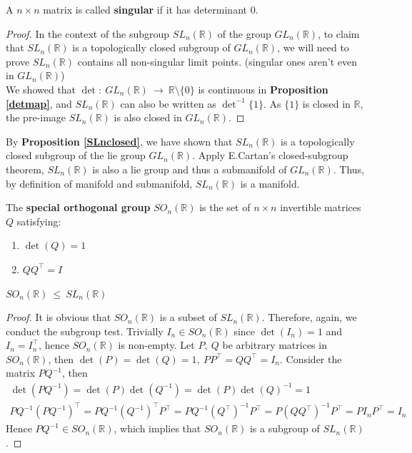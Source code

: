 \documentclass[12pt,twoside]{article}
\begin{document}
\begin{definition}
A $n\times n$ matrix is called \textbf{singular} if it has determinant 0.
\end{definition}

\begin{proof}
In the context of the subgroup $SL_{n}(\mathbb{R})$ of the group $GL_{n}(\mathbb{R})$, to claim that $SL_{n}(\mathbb{R})$ is a topologically closed subgroup of $GL_{n}(\mathbb{R})$, we will need to prove $SL_{n}(\mathbb{R})$ contains all non-singular limit points. (singular ones aren't even in $GL_{n}(\mathbb{R})$)\\
We showed that $\det:\ GL_{n}(\mathbb{R})\ \rightarrow\ \mathbb{R}\setminus \{0\}$ is continuous in \textbf{Proposition \ref{detmap}}, and $SL_{n}(\mathbb{R})$ can also be written as $\det^{-1}\{1\}$. As $\{1\}$ is closed in $\mathbb{R}$, the pre-image $SL_{n}(\mathbb{R})$ is also closed in $GL_{n}(\mathbb{R})$.
\end{proof}

By \textbf{Proposition \ref{SLnclosed}}, we have shown that $SL_{n}(\mathbb{R})$ is a topologically closed subgroup of the lie group $GL_{n}(\mathbb{R})$. Apply E.Cartan's closed-subgroup theorem, $SL_{n}(\mathbb{R})$ is also a lie group and thus a submanifold of $GL_{n}(\mathbb{R})$. Thus, by definition of manifold and submanifold, $SL_{n}(\mathbb{R})$ is a manifold.

\begin{definition}
The \textbf{special orthogonal group} $SO_{n}(\mathbb{R})$ is the set of $n\times n$ invertible matrices $Q$ satisfying:
\begin{enumerate}
    \item $\det(Q)=1$
    \item $QQ^{\mathbf{\top}} = I$
\end{enumerate}
\end{definition}

\begin{proposition}
$SO_{n}(\mathbb{R})\ \leqslant\ SL_{n}(\mathbb{R})$
\end{proposition}
\begin{proof}
It is obvious that $SO_n(\mathbb{R})$ is a subset of $SL_n(\mathbb{R})$. Therefore, again, we conduct the subgroup test. Trivially $I_n \in SO_n(\mathbb{R})$ since $\det(I_n)=1$ and $I_n = I_n^{\top}$, hence $SO_n(\mathbb{R})$ is non-empty. Let $P,\  Q$ be arbitrary matrices in $SO_n(\mathbb{R})$, then $\det(P)=\det(Q)=1,\ PP^{\top}=QQ^{\top} = I_n$. Consider the matrix $PQ^{-1}$, then
\begin{gather*}
\det(PQ^{-1}) = \det(P)\det(Q^{-1}) = \det(P)\det(Q)^{-1} = 1\\
PQ^{-1}(PQ^{-1})^{\top} = PQ^{-1}(Q^{-1})^{\top}P^{\top} = PQ^{-1}(Q^{\top})^{-1}P^{\top} = P(QQ^{\top})^{-1}P^{\top} = PI_nP^{\top} = I_n
\end{gather*}
Hence $PQ^{-1} \in SO_n(\mathbb{R})$, which implies that $SO_n(\mathbb{R})$ is a subgroup of $SL_n(\mathbb{R})$.
\end{proof}
\end{document}
